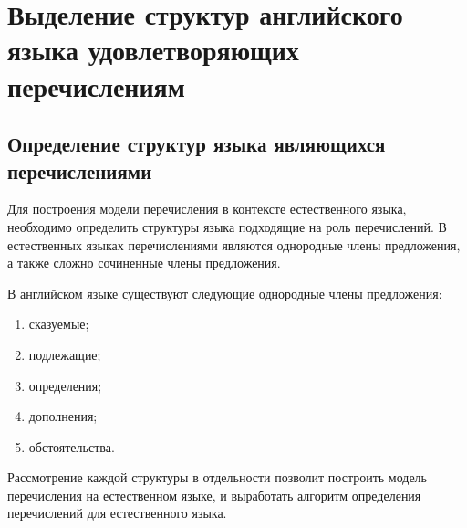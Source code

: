 \documentclass{standalone}
\begin{document}
\chapter{Выделение структур английского языка удовлетворяющих перечислениям}%
\ttl
\section{Определение структур языка являющихся перечислениями}
\par Для построения модели перечисления в контексте естественного языка, необходимо определить структуры языка подходящие на роль перечислений. В естественных языках перечислениями являются однородные члены предложения, а также сложно сочиненные члены предложения.
\par В английском языке существуют следующие однородные члены предложения:
\begin{enumerate}
    \item сказуемые;
    \item подлежащие;
    \item определения;
    \item дополнения;
    \item обстоятельства.
\end{enumerate}
\par Рассмотрение каждой структуры в отдельности позволит построить модель перечисления на естественном языке, и выработать алгоритм определения перечислений для естественного языка.
\end{document}
